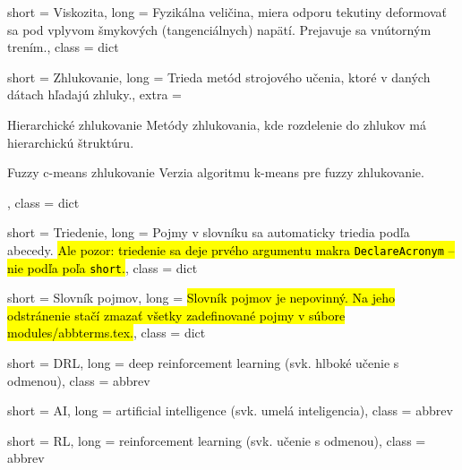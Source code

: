 

 {
	short = Viskozita,
	long = {Fyzikálna veličina, miera odporu tekutiny deformovať sa pod vplyvom šmykových (tangenciálnych) napätí. Prejavuje sa vnútorným trením.},
	class = dict
}

 {
	short = Zhlukovanie,
	long = {Trieda metód strojového učenia, ktoré v daných dátach hľadajú zhluky.},
	extra = {\begin{subdict}
			\item[Hierarchické zhlukovanie] Metódy zhlukovania, kde rozdelenie do zhlukov má hierarchickú štruktúru.
			\item[Fuzzy c-means zhlukovanie] Verzia algoritmu k-means pre fuzzy zhlukovanie.
		\end{subdict}
	},
	class = dict
}

 {
	short = Triedenie,
	long = {Pojmy v slovníku sa automaticky triedia podľa abecedy. \hl{Ale pozor: triedenie sa deje prvého argumentu makra \texttt{DeclareAcronym} -- nie podľa poľa \texttt{short}.}},
	class = dict
}

 {
	short = Slovník pojmov,
	long = {\hl{Slovník pojmov je nepovinný. Na jeho odstránenie stačí zmazať všetky zadefinované pojmy v súbore modules/abbterms.tex.}},
	class = dict
}


 {
	short = DRL,
	long = deep reinforcement learning (svk. hlboké učenie s odmenou),
	class = abbrev
}

 {
	short = AI,
	long = {artificial intelligence (svk. umelá inteligencia)},
	class = abbrev
}

 {
	short = RL,
	long = {reinforcement learning (svk. učenie s odmenou)},
	class = abbrev
}
